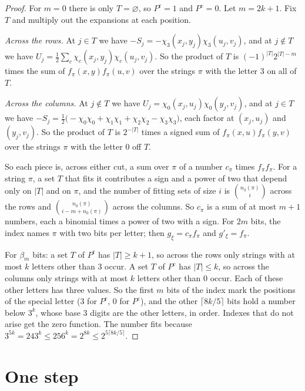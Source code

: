\documentclass[11pt]{article}
\begin{document}
\begin{proof}
For $m=0$ there is only $T=\varnothing$, so $P^{\mathrm r}=1$ and $P^{\mathrm c}=0$. Let $m=2k+1$. Fix $T$ and multiply out the expansions at each position.

\emph{Across the rows.} At $j\in T$ we have $-S_j=-\chi_3(x_j,y_j)\chi_3(u_j,v_j)$, and at $j\notin T$ we have $U_j=\frac12\sum_c\chi_c(x_j,y_j)\chi_c(u_j,v_j)$. So the product of $T$ is $(-1)^{|T|}2^{|T|-m}$ times the sum of $f_\pi(x,y)f_\pi(u,v)$ over the strings $\pi$ with the letter $3$ on all of $T$.

\emph{Across the columns.} At $j\notin T$ we have $U_j=\chi_0(x_j,u_j)\chi_0(y_j,v_j)$, and at $j\in T$ we have $-S_j=\frac12\bigl(-\chi_0\chi_0+\chi_1\chi_1+\chi_2\chi_2-\chi_3\chi_3\bigr)$, each factor at $(x_j,u_j)$ and $(y_j,v_j)$. So the product of $T$ is $2^{-|T|}$ times a signed sum of $f_\pi(x,u)f_\pi(y,v)$ over the strings $\pi$ with the letter $0$ off $T$.

So each piece is, across either cut, a sum over $\pi$ of a number $c_\pi$ times $f_\pi f_\pi$. For a string $\pi$, a set $T$ that fits it contributes a sign and a power of two that depend only on $|T|$ and on $\pi$, and the number of fitting sets of size $i$ is $\binom{n_3(\pi)}{i}$ across the rows and $\binom{n_0(\pi)}{i-m+n_0(\pi)}$ across the columns. So $c_\pi$ is a sum of at most $m+1$ numbers, each a binomial times a power of two with a sign. For $2m$ bits, the index names $\pi$ with two bits per letter; then $g_\xi=c_\pi f_\pi$ and $g'_\xi=f_\pi$.

For $\beta_m$ bits: a set $T$ of $P^{\mathrm r}$ has $|T|\ge k+1$, so across the rows only strings with at most $k$ letters other than $3$ occur. A set $T$ of $P^{\mathrm c}$ has $|T|\le k$, so across the columns only strings with at most $k$ letters other than $0$ occur. Each of these other letters has three values. So the first $m$ bits of the index mark the positions of the special letter ($3$ for $P^{\mathrm r}$, $0$ for $P^{\mathrm c}$), and the other $\lceil8k/5\rceil$ bits hold a number below $3^k$, whose base $3$ digits are the other letters, in order. Indexes that do not arise get the zero function. The number fits because $3^{5k}=243^k\le256^k=2^{8k}\le2^{5\lceil8k/5\rceil}$.
\end{proof}

\section{One step}\label{sec:step}
\end{document}
